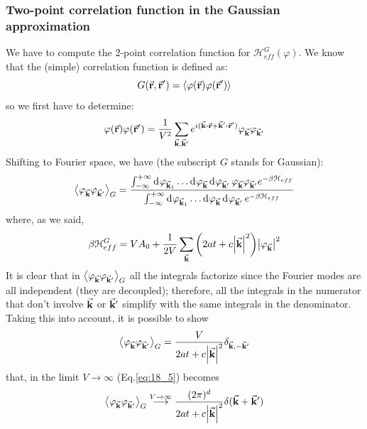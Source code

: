 \documentclass[../main/main.tex]{subfiles}
\begin{document}
\subsubsection{Two-point correlation function in the Gaussian approximation}
We have to compute the  \( 2 \)-point correlation function for \( \mathcal{H}_{eff}^G (\varphi) \).
We know that the (simple)  correlation function is defined as:
\begin{equation*}
  G ( \va{r}, \va{r}') = \expval{ \varphi(\va{r})\varphi(\va{r}')}
\end{equation*}
so we first have to determine:
\begin{equation*}
   \varphi(\va{r})\varphi(\va{r}') = \frac{1}{V^2} \sum_{\va{k}, \va{k}'}^{}
   e^{i (\va{k} \vdot \va{r} + \va{k}' \vdot \va{r}')} \varphi_{\va{k}} \varphi_{\va{k}'}
\end{equation*}
Shifting to Fourier space, we have (the subscript \( G \) stands for Gaussian):
\begin{equation*}
  \expval{\varphi _{\va{k}} \varphi _{\va{k}'}}_G =
\frac{\int_{- \infty }^{+ \infty } \dd[]{  \varphi_{\va{k}_1} }  \dots
  \dd[]{  \varphi_{\va{k}} }  \dd[]{ \varphi_{\va{k}'} }
   \varphi_{\va{k}} \varphi_{\va{k}'} e^{- \beta \mathcal{H}_{eff}}
 }{
 \int_{- \infty }^{+ \infty } \dd[]{  \varphi_{\va{k}_1} }  \dots
   \dd[]{  \varphi_{\va{k}} }  \dd[]{ \varphi_{\va{k}'} }
    e^{- \beta \mathcal{H}_{eff}}
 }
\end{equation*}
where, as we said,
\begin{equation*}
  \beta \mathcal{H}_{eff}^G = V A_0  + \frac{1}{2V} \sum_{\va{k}}^{} \qty(2 a t + c  \abs{\va{k}}^2) \abs{\varphi _{\va{k}}}^2
\end{equation*}
It is clear that in \(   \expval{\varphi _{\va{k}} \varphi _{\va{k}'}}_G  \)  all the integrals factorize since the Fourier modes are all independent (they are decoupled); therefore, all the integrals in the numerator that don't involve \( \va{k} \) or \( \va{k}' \) simplify with the same integrals in the denominator. Taking this into account, it is possible to show
\begin{equation*}
  \expval{\varphi _{\va{k}} \varphi _{\va{k}'}}_G =  \frac{V}{2 a t + c \abs{\va{k}}^2} \delta _{\va{k},-\va{k}'}
\end{equation*}
that, in the limit \( V \rightarrow \infty  \) (Eq.\eqref{eq:18_5}) becomes
\begin{equation}
    \expval{\varphi _{\va{k}} \varphi _{\va{k}'}}_G \overset{V \rightarrow \infty }{\longrightarrow} \frac{(2 \pi )^d}{2 a t + c \abs{\va{k}}^2} \delta  (\va{k}+ \va{k}')
\end{equation}
\end{document}
